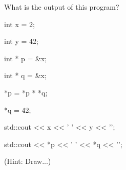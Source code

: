 What is the output of this program?

\begin{consolethree}[escapeinside=||]

int x = 2;

int y = 42;

int * p = &x;

int * q = &x;

*p = *p * *q;

*q = 42;

std::cout << x << ' ' << y << '\n';

std::cout << *p << ' ' << *q << '\n';

\end{consolethree}

(Hint: Draw...)

